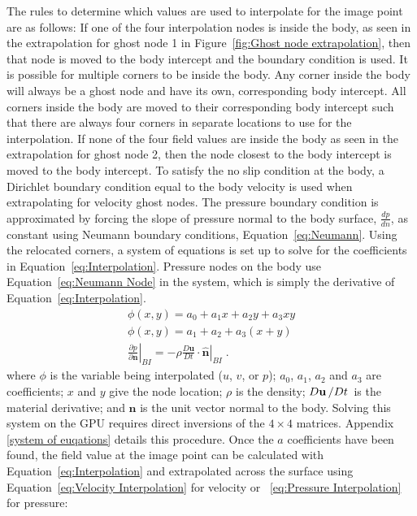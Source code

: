 The rules to determine which values are used to interpolate for the image point are as follows: 
If one of the four interpolation nodes is inside the body, as seen in the extrapolation for ghost node 1 in Figure~\ref{fig:Ghost node extrapolation}, then that node is moved to the body intercept and the boundary condition is used. 
It is possible for multiple corners to be inside the body. 
Any corner inside the body will always be a ghost node and have its own, corresponding body intercept. 
All corners inside the body are moved to their corresponding body intercept such that there are always four corners in separate locations to use for the interpolation. 
If none of the four field values are inside the body as seen in the extrapolation for ghost node 2, then the node closest to the body intercept is moved to the body intercept.
To satisfy the no slip condition at the body, a Dirichlet boundary condition equal to the body velocity is used when extrapolating for velocity ghost nodes. 
The pressure boundary condition is approximated by forcing the slope of pressure normal to the body surface, $\frac{dp}{dn}$, as constant using Neumann boundary conditions, Equation~\eqref{eq:Neumann}. 
Using the relocated corners, a system of equations is set up to solve for the coefficients in Equation~\eqref{eq:Interpolation}. 
Pressure nodes on the body use Equation~\eqref{eq:Neumann Node} in the system, which is simply the derivative of Equation~\eqref{eq:Interpolation}. 
\begin{align}
\phi (x,y) = a_0 + a_1 x + a_2y + a_3 x y \label{eq:Interpolation} \\
\phi (x,y) = a_1 + a_2 + a_3 (x+y) \label{eq:Neumann Node} \\
\left. \frac{\partial p}{\partial \textbf{n}}\right|_{BI} = \left. -\rho \frac{D\textbf{u}}{Dt}\cdot \hat{\textbf{n}}\right|_{BI}
\label{eq:Neumann}\;.
\end{align}
where $\phi$ is the variable being interpolated ($u$, $v$, or $p$); $a_0$, $a_1$, $a_2$ and $a_3$ are coefficients; $x$ and $y$ give the node location;
$\rho$ is the density; $D\textbf{u}\left/Dt\right.$ is the material derivative; and $\textbf{n}$ is the unit vector normal to the body.
Solving this system on the GPU requires direct inversions of the $4 \times 4$ matrices. 
Appendix \ref{system of euqations} details this procedure. 
Once the $a$ coefficients have been found, the field value at the image point can be calculated with Equation~\eqref{eq:Interpolation} and extrapolated across the surface using Equation~\eqref{eq:Velocity Interpolation} for velocity or ~\eqref{eq:Pressure Interpolation} for pressure: 

